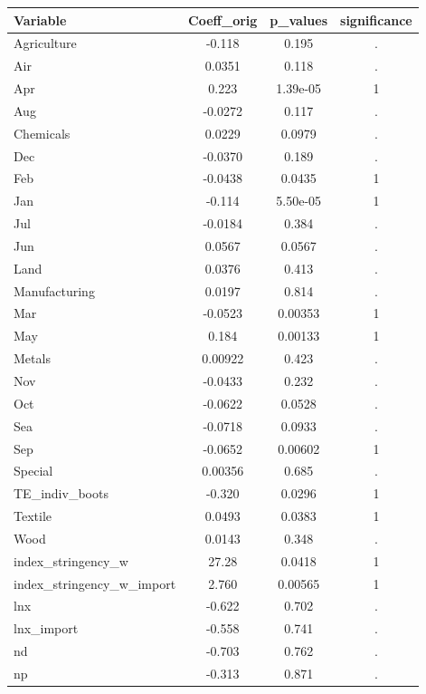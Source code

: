 \documentclass[]{article}
\begin{document}
\begin{tabular}{lccc} \hline
Variable & Coeff\_orig & p\_values & significance \\ \hline
Agriculture & -0.118 & 0.195 & . \\
Air & 0.0351 & 0.118 & . \\
Apr & 0.223 & 1.39e-05 & 1 \\
Aug & -0.0272 & 0.117 & . \\
Chemicals & 0.0229 & 0.0979 & . \\
Dec & -0.0370 & 0.189 & . \\
Feb & -0.0438 & 0.0435 & 1 \\
Jan & -0.114 & 5.50e-05 & 1 \\
Jul & -0.0184 & 0.384 & . \\
Jun & 0.0567 & 0.0567 & . \\
Land & 0.0376 & 0.413 & . \\
Manufacturing & 0.0197 & 0.814 & . \\
Mar & -0.0523 & 0.00353 & 1 \\
May & 0.184 & 0.00133 & 1 \\
Metals & 0.00922 & 0.423 & . \\
Nov & -0.0433 & 0.232 & . \\
Oct & -0.0622 & 0.0528 & . \\
Sea & -0.0718 & 0.0933 & . \\
Sep & -0.0652 & 0.00602 & 1 \\
Special & 0.00356 & 0.685 & . \\
TE\_indiv\_boots & -0.320 & 0.0296 & 1 \\
Textile & 0.0493 & 0.0383 & 1 \\
Wood & 0.0143 & 0.348 & . \\
index\_stringency\_w & 27.28 & 0.0418 & 1 \\
index\_stringency\_w\_import & 2.760 & 0.00565 & 1 \\
lnx & -0.622 & 0.702 & . \\
lnx\_import & -0.558 & 0.741 & . \\
nd & -0.703 & 0.762 & . \\
 np & -0.313 & 0.871 & . \\ \hline
\end{tabular}
\end{document}
